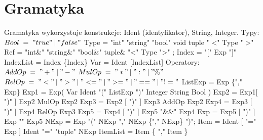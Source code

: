 \documentclass{article}
\begin{document}
\section{Gramatyka} 
Gramatyka wykorzystuje konstrukcje: Ident (identyfikator), String, Integer. \newline
Typy: \newline
$Bool \; = \; "true" \:|\: "false"  $\newline
Type\; = \; "int" \;\textbar\; "string" \;\textbar\; "bool" \;\textbar\; void \;\textbar\; tuple " \textless " Type " \textgreater "  \newline
Ref\; = \; "int\&" \;\textbar\; "string\&" \;\textbar\; "bool\&"  \;\textbar\; tuple\& "\textless" Type "\textgreater" ;\newline
Index \; = \; "[" Exp "]" \newline
IndexList \; = \; Index \{Index\} \newline
Var \; = \; Ident [IndexList] \newline
Operatory: \newline
$ AddOp \; = \; "+" \:|\: "-"  $\newline
$ MulOp \; = \; "*" \:|\: ":" \:|\: "\%"  $\newline
$ RelOp\; = \; "<" \:|\: ">" \:|\: "< =" \:|\: "> =" \:|\: "==" \:|\: "!=   "  $\newline
ListExp \; = \; [Exp] \;\textbar\; Exp \{"," Exp\} \newline
Exp1 \; = \; 
["("]\;Exp\;[")"] \;\textbar\;  
[{-\;\textbar\;!}] \;(  Var\;  \textbar \; \;Ident \; "(" \;ListExp \;")"\;  \textbar \;Integer \;\textbar \;String \;\textbar \;Bool \;)  \newline
Exp2 \; = \; [ "(" ] Exp1[ ")" ]   \textbar Exp2  MulOp  Exp2  \newline
Exp3 \; = \; [ "(" ] Exp2 [ ")" ]  \textbar Exp3  AddOp  Exp2  \newline
Exp4 \; = \; [ "(" ] Exp3 [ ")" ]  \textbar Exp4  RelOp  Exp3  \newline
Exp5 \; = \; [ "(" ] Exp4 [ ")" ]  \textbar Exp5  "\&\&" Exp4  \newline
Exp  \; = \; [ "(" ] Exp5 [ ")" ]  \textbar Exp  "\textbar\textbar" Exp5 \newline
\newline
NExp \; = \; Exp \; \textbar \; "(" NExp "," NExp \{"," NExp\} ")";\newline
Item \; = \; Ident [ "=" Exp ] \;\textbar\; Ident "=" "tuple" NExp \newline
ItemList \; = \; Item  \{ ","  Item \} \newline
\end{document}
